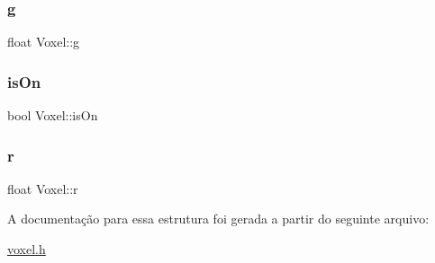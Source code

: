 \subsubsection{\texorpdfstring{g}{g}}
{\footnotesize\ttfamily float Voxel\+::g}

\mbox{\label{struct_voxel_a6fbe8bd53f64685ac4210726d40fc775}} 
\subsubsection{\texorpdfstring{isOn}{isOn}}
{\footnotesize\ttfamily bool Voxel\+::is\+On}

\mbox{\label{struct_voxel_a06872ec79b836120b551a848968c0f1b}} 
\subsubsection{\texorpdfstring{r}{r}}
{\footnotesize\ttfamily float Voxel\+::r}



A documentação para essa estrutura foi gerada a partir do seguinte arquivo\+:\begin{DoxyCompactItemize}
\item 
\mbox{\hyperlink{voxel_8h}{voxel.\+h}}\end{DoxyCompactItemize}
